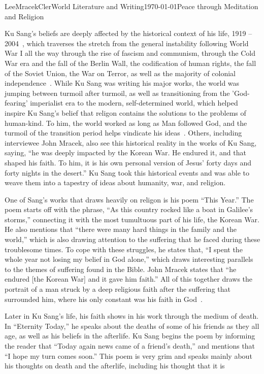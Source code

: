 \documentclass[12pt,letterpaper]{article}
\begin{document}
\begin{mla}{Lee}{Mracek}{Cler}{World Literature and Writing}{\today}{Peace through Meditation and Religion}
    Ku Sang's beliefs are deeply affected by the historical context of his life, 1919 -- 2004~\parencite{koreanlit}, which traverses the stretch from the general instability following World War I all the way through the rise of fascism and communism, through the Cold War era and the fall of the Berlin Wall, the codification of human rights, the fall of the Soviet Union, the War on Terror, as well as the majority of colonial independence~\parencite{diego}. While Ku Sang was writing
    his major works, the world was jumping between turmoil after turmoil, as well as transitioning from the 'God-fearing' imperialist era to the modern, self-determined world, which helped inspire Ku Sang's belief that religon contains the solutions to the problems of human-kind. To him, the world worked as long as Man followed God, and the turmoil of the transition period helps vindicate his ideas~\parencite{taize}. Others, including interviewee John Mracek, also see this
    historical reality in the works of Ku Sang, saying, ``he was deeply impacted by the Korean War. He endured it, and that shaped his faith. To him, it is his own personal version of Jesus' forty days and forty nights in the desert.'' Ku Sang took this historical events and was able to weave them into a tapestry of ideas about humanity, war, and religion.\\
    One of Sang's works that draws heavily on religon is his poem ``This Year.'' The poem starts off with the phrase, ``As this country rocked like a boat in Galilee's storms,'' connecting it with the most tumultuous part of his life, the Korean War. He also mentions that ``there were many hard things in the family and the world,'' which is also drawing attention to the suffering that he faced during these troublesome times. To cope with these struggles, he states that, ``I spent
    the whole year not losing my belief in God alone,'' which draws interesting parallels to the themes of suffering found in the Bible. John Mracek states that ``he endured [the Korean War] and it gave him faith.'' All of this together draws the portrait of a man struck by a deep religious faith after the suffering that surrounded him, where his only constant was his faith in God~\parencite{diego}.\\
    Later in Ku Sang's life, his faith shows in his work through the medium of death. In ``Eternity Today,'' he speaks about the deaths of some of his friends as they all age, as well as his beliefs in the afterlife. Ku Sang begins the poem by informing the reader that ``Today again news came of a friend's death,'' and mentions that ``I hope my turn comes soon.'' This poem is very grim and speaks mainly about his thoughts on death and the afterlife, including his thought that it is

\end{mla}
\end{document}
